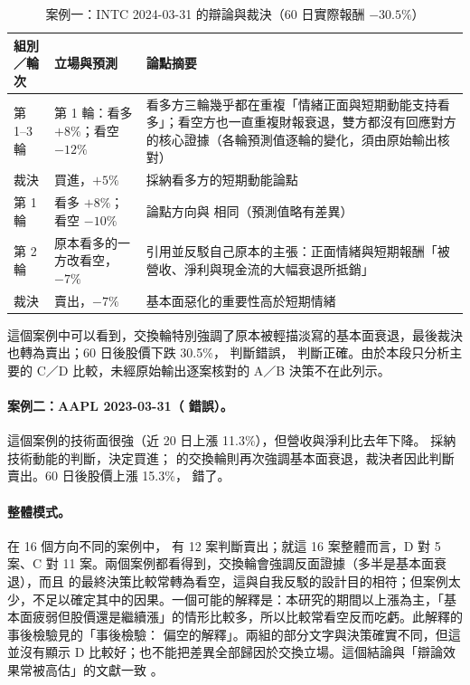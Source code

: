 \begin{table}[H]
\centering\small
\caption{案例一：INTC 2024-03-31 的辯論與裁決（60 日實際報酬 $-30.5\%$）}
\label{tab:case}
\begin{tabularx}{\textwidth}{@{}L{.17} L{.22} Y@{}}
\toprule
組別／輪次 & 立場與預測 & 論點摘要 \\
\midrule
{} 第 1--3 輪 & 第 1 輪：看多 $+8\%$；看空 $-12\%$ & 看多方三輪幾乎都在重複「情緒正面與短期動能支持看多」；看空方也一直重複財報衰退，雙方都沒有回應對方的核心證據（各輪預測值逐輪的變化，須由原始輸出核對） \\
 裁決 & 買進，$+5\%$ & 採納看多方的短期動能論點 \\
\midrule
{} 第 1 輪 & 看多 $+8\%$；看空 $-10\%$ & 論點方向與  相同（預測值略有差異） \\
 第 2 輪 & 原本看多的一方改看空，$-7\%$ & 引用並反駁自己原本的主張：正面情緒與短期報酬「被營收、淨利與現金流的大幅衰退所抵銷」 \\
 裁決 & 賣出，$-7\%$ & 基本面惡化的重要性高於短期情緒 \\
\bottomrule
\end{tabularx}
\end{table}

這個案例中可以看到，交換輪特別強調了原本被輕描淡寫的基本面衰退，最後裁決也轉為賣出；60 日後股價下跌 30.5\%， 判斷錯誤， 判斷正確。由於本段只分析主要的 C／D 比較，未經原始輸出逐案核對的 A／B 決策不在此列示。

\paragraph{案例二：AAPL 2023-03-31（ 錯誤）。} 這個案例的技術面很強（近 20 日上漲 11.3\%），但營收與淨利比去年下降。 採納技術動能的判斷，決定買進； 的交換輪則再次強調基本面衰退，裁決者因此判斷賣出。60 日後股價上漲 15.3\%， 錯了。

\paragraph{整體模式。} 在 16 個方向不同的案例中， 有 12 案判斷賣出；就這 16 案整體而言，D 對 5 案、C 對 11 案。兩個案例都看得到，交換輪會強調反面證據（多半是基本面衰退），而且  的最終決策比較常轉為看空，這與自我反駁的設計目的相符；但案例太少，不足以確定其中的因果。一個可能的解釋是：本研究的期間以上漲為主，「基本面疲弱但股價還是繼續漲」的情形比較多，所以比較常看空反而吃虧。此解釋的事後檢驗見的「事後檢驗： 偏空的解釋」。兩組的部分文字與決策確實不同，但這並沒有顯示 D 比較好；也不能把差異全部歸因於交換立場。這個結論與「辯論效果常被高估」的文獻一致 \citep{smit2023mad,zhang2025stop}。
